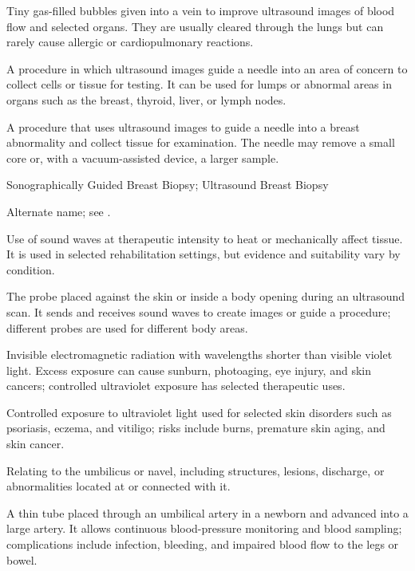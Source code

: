  Tiny gas-filled bubbles given into a vein to improve ultrasound images of blood flow and selected organs. They are usually cleared through the lungs but can rarely cause allergic or cardiopulmonary reactions.

 A procedure in which ultrasound images guide a needle into an area of concern to collect cells or tissue for testing. It can be used for lumps or abnormal areas in organs such as the breast, thyroid, liver, or lymph nodes.

 A procedure that uses ultrasound images to guide a needle into a breast abnormality and collect tissue for examination. The needle may remove a small core or, with a vacuum-assisted device, a larger sample.

\synonyms
Sonographically Guided Breast Biopsy; Ultrasound Breast Biopsy

 Alternate name; see .

 Use of sound waves at therapeutic intensity to heat or mechanically affect tissue. It is used in selected rehabilitation settings, but evidence and suitability vary by condition.

 The probe placed against the skin or inside a body opening during an ultrasound scan. It sends and receives sound waves to create images or guide a procedure; different probes are used for different body areas.

 Invisible electromagnetic radiation with wavelengths shorter than visible violet light. Excess exposure can cause sunburn, photoaging, eye injury, and skin cancers; controlled ultraviolet exposure has selected therapeutic uses.

 Controlled exposure to ultraviolet light used for selected skin disorders such as psoriasis, eczema, and vitiligo; risks include burns, premature skin aging, and skin cancer.

 Relating to the umbilicus or navel, including structures, lesions, discharge, or abnormalities located at or connected with it.

 A thin tube placed through an umbilical artery in a newborn and advanced into a large artery. It allows continuous blood-pressure monitoring and blood sampling; complications include infection, bleeding, and impaired blood flow to the legs or bowel.

